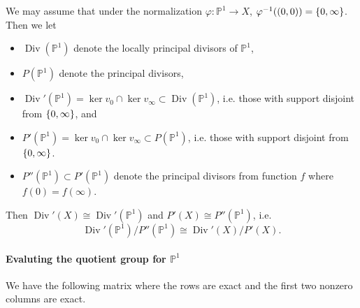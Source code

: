 \documentclass{article}
\begin{document}
We may assume that under the normalization $\varphi\colon\mathbb{P}^1 \to X$, $\varphi^{-1}((0,0)) = \qty{0,\infty}$.
Then we let
\begin{itemize}
    \item $\operatorname{Div}(\mathbb{P}^1)$ denote the locally principal divisors of $\operatorname{\mathbb{P}^1}$,
    \item $P(\mathbb{P}^1)$ denote the principal divisors,
    \item $\operatorname{Div}'(\mathbb{P}^1) = \ker v_{0} \cap \ker v_{\infty} \subset \operatorname{Div}(\mathbb{P}^1)$, i.e. those with support disjoint from $\qty{0,\infty}$, and
    \item $P'(\mathbb{P}^1) = \ker v_{0} \cap \ker v_{\infty} \subset P(\mathbb{P}^1)$, i.e. those with support disjoint from $\qty{0,\infty}$.
    \item $P''(\mathbb{P}^1) \subset P'(\mathbb{P}^1)$ denote the principal divisors from function $f$ where $f(0) = f(\infty)$.
\end{itemize}
Then $\operatorname{Div}'(X) \cong \operatorname{Div}'(\mathbb{P}^1)$ and $P'(X) \cong P''(\mathbb{P}^1)$, i.e.
\begin{equation}
    \label{eq:pull_back}
    \operatorname{Div}'(\mathbb{P}^1)/P''(\mathbb{P}^1) \cong \operatorname{Div}'(X)/P'(X).
\end{equation}

\paragraph*{Evaluting the quotient group for $\mathbb{P}^1$}
We have the following matrix where the rows are exact and the first two nonzero columns are exact.
\begin{center}
\end{center}
\end{document}

